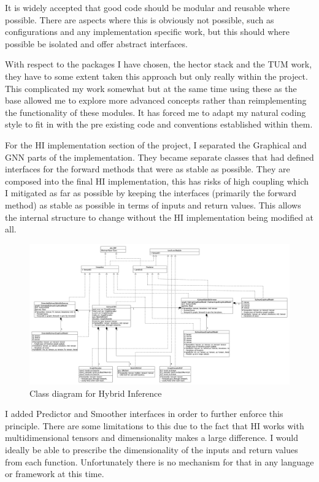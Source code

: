 \documentclass[]{../resources/final_report}
\begin{document}
It is widely accepted that good code should be modular and reusable where possible. There are aspects where this is obviously not possible, such as configurations and any implementation specific work, but this should where possible be isolated and offer abstract interfaces.

With respect to the packages I have chosen, the hector stack and the TUM work, they have to some extent taken this approach but only really within the project. This complicated my work somewhat but at the same time using these as the base allowed me to explore more advanced concepts rather than reimplementing the functionality of these modules. It has forced me to adapt my natural coding style to fit in with the pre existing code and conventions established within them. 

For the HI implementation section of the project, I separated the Graphical and GNN parts of the implementation. They became separate classes that had defined interfaces for the forward methods that were as stable as possible. They are composed into the final HI implementation, this has risks of high coupling which I mitigated as far as possible by keeping the interfaces (primarily the forward method) as stable as possible in terms of inputs and return values. This allows the internal structure to change without the HI implementation being modified at all.

\begin{figure}[h!]
  \centering
  \includegraphics[height=0.36\textheight]{hybrid-inference-uml.png}
  \caption{Class diagram for Hybrid Inference}
  \label{}
\end{figure}

I added Predictor and Smoother interfaces in order to further enforce this principle. There are some limitations to this due to the fact that HI works with multidimensional tensors and dimensionality makes a large difference. I would ideally be able to prescribe the dimensionality of the inputs and return values from each function. Unfortunately there is no mechanism for that in any language or framework at this time.
\end{document}
